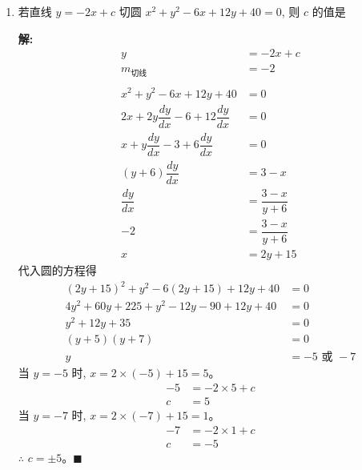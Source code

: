 \documentclass[10pt]{article}
\newcommand{\sol}{\textbf{解:} }
\begin{document}
\begin{enumerate}[leftmargin=*]
  \item 若直线 $y=-2 x+c$ 切圆 $x^{2}+y^{2}-6 x+12 y+40=0$, 则 $c$ 的值是

        \sol{}
        \begin{align*}
          y                                            & = -2x + c          \\
          m_{\text{切线}}                                & = -2               \\
          \\
          x^{2}+y^{2}-6x+12y+40                        & = 0                \\
          2x+2y \dfrac{dy}{dx} - 6 + 12 \dfrac{dy}{dx} & = 0                \\
          x + y \dfrac{dy}{dx} - 3 + 6 \dfrac{dy}{dx}  & = 0                \\
          (y+6) \dfrac{dy}{dx}                         & = 3 - x            \\
          \dfrac{dy}{dx}                               & = \dfrac{3-x}{y+6} \\
          -2                                           & = \dfrac{3-x}{y+6} \\
          x                                            & = 2y + 15
        \end{align*}
        代入圆的方程得
        \begin{align*}
          (2y + 15)^{2} + y^{2} - 6(2y + 15) + 12y + 40    & = 0                \\
          4y^{2} + 60y + 225 + y^{2} - 12y - 90 + 12y + 40 & = 0                \\
          y^{2} + 12y + 35                                 & = 0                \\
          (y+5)(y+7)                                       & = 0                \\
          y                                                & = -5 \text{ 或 } -7
        \end{align*}
        当 $y = -5$ 时, $x = 2 \times (-5) + 15 = 5$。
        \begin{align*}
          -5 & = -2 \times 5 + c \\
          c  & = 5
        \end{align*}
        当 $y = -7$ 时, $x = 2 \times (-7) + 15 = 1$。
        \begin{align*}
          -7 & = -2 \times 1 + c \\
          c  & = -5
        \end{align*}
        $\therefore$ $c = \pm 5$。\hfill$\blacksquare$


\end{enumerate}
\end{document}

